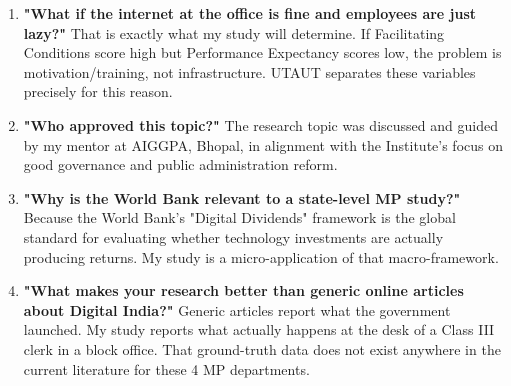 \documentclass[11pt,a4paper]{article}
\begin{document}
\begin{enumerate}[itemsep=8pt]
    \item \textbf{"What if the internet at the office is fine and employees are just lazy?"} That is exactly what my study will determine. If Facilitating Conditions score high but Performance Expectancy scores low, the problem is motivation/training, not infrastructure. UTAUT separates these variables precisely for this reason.

    \item \textbf{"Who approved this topic?"} The research topic was discussed and guided by my mentor at AIGGPA, Bhopal, in alignment with the Institute's focus on good governance and public administration reform.

    \item \textbf{"Why is the World Bank relevant to a state-level MP study?"} Because the World Bank's "Digital Dividends" framework is the global standard for evaluating whether technology investments are actually producing returns. My study is a micro-application of that macro-framework.

    \item \textbf{"What makes your research better than generic online articles about Digital India?"} Generic articles report what the government launched. My study reports what actually happens at the desk of a Class III clerk in a block office. That ground-truth data does not exist anywhere in the current literature for these 4 MP departments.
\end{enumerate}
\end{document}
